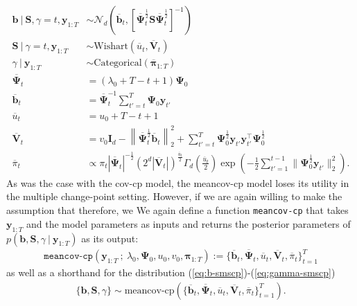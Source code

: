 \begin{align}
    \mathbf{b} \:|\: \mathbf{S}, \gamma = t, \mathbf{y}_{1:T} &\sim \mathcal{N}_d\left(\overline{\mathbf{b}}_t, \left[\overline{\boldsymbol{\Psi}}^{\frac{1}{2}}_t \mathbf{S} \overline{\boldsymbol{\Psi}}^{\frac{1}{2}}_t\right]^{-1} \right) \label{eq:b-smscp} \\
    \mathbf{S} \:|\: \gamma = t, \mathbf{y}_{1:T} &\sim \text{Wishart}(\overline{u}_t, \overline{\mathbf{V}}_t)  \\
    \gamma \:|\: \mathbf{y}_{1:T} &\sim \text{Categorical}(\overline{\boldsymbol{\pi}}_{1:T}) \label{eq:gamma-smscp} \\
    \overline{\boldsymbol{\Psi}}_t &= (\lambda_0 + T-t+1)\boldsymbol{\Psi}_0 \\
    \overline{\mathbf{b}}_t &= \overline{\boldsymbol{\Psi}}_t^{-1}\sum_{t'=t}^{T} \boldsymbol{\Psi}_0\mathbf{y}_{t'} \\
    \overline{u}_t &= u_0 + T - t + 1 \\
    \overline{\mathbf{V}}_t &= v_0\mathbf{I}_d - \left\lVert\overline{\boldsymbol{\Psi}}^{\frac{1}{2}}_t\overline{\mathbf{b}}_t\right\rVert_2^2 +  \sum_{t'=t}^{T} \boldsymbol{\Psi}_0^{\frac{1}{2}}\mathbf{y}_{t'} \mathbf{y}_{t'}^\intercal\boldsymbol{\Psi}_0^{\frac{1}{2}}\\
    \overline{\pi}_t &\propto \pi_t |\overline{\boldsymbol{\Psi}}_t |^{-\frac{1}{2}} \left(2^d |\overline{\mathbf{V}}_{t}|\right)^{\frac{\overline{u}_{t}}{2}}\Gamma_d\left(\frac{\overline{u}_{t}}{2}\right)\exp\left(- \frac{1}{2}\sum_{t'=1}^{t-1} \lVert\boldsymbol{\Psi}_0^{\frac{1}{2}}\mathbf{y}_{t'}\rVert_2^2\right).
\end{align}
As was the case with the cov-cp model, the meancov-cp model loses its utility in the multiple change-point setting. However, if we are again willing to make the assumption that  therefore, we We again define a function \texttt{meancov-cp} that takes $\mathbf{y}_{1:T}$ and the model parameters as inputs and returns the posterior parameters of $p(\mathbf{b}, \mathbf{S}, \gamma\:|\:\mathbf{y}_{1:T})$ as its output:
\begin{align}
    \texttt{meancov-cp}\left(\mathbf{y}_{1:T} \:;\: \lambda_0, \boldsymbol{\Psi}_0, u_0, v_0, \boldsymbol{\pi}_{1:T}\right) := \{\overline{\mathbf{b}}_t, \overline{\boldsymbol{\Psi}}_t, \overline{u}_t, \overline{\mathbf{V}}_t, \overline{\pi}_t\}_{t=1}^T
\end{align}
as well as a shorthand for the distribution (\ref{eq:b-smscp})-(\ref{eq:gamma-smscp})
\begin{align}
    \{\mathbf{b}, \mathbf{S}, \gamma\}\sim\text{meancov-cp}(\{\overline{\mathbf{b}}_t, \overline{\boldsymbol{\Psi}}_t, \overline{u}_t, \overline{\mathbf{V}}_t, \overline{\pi}_t\}_{t=1}^T).
\end{align}
